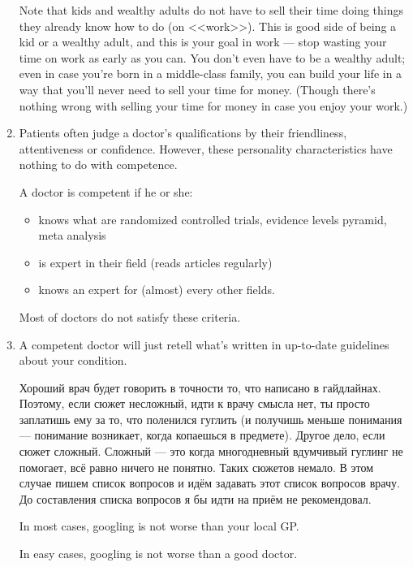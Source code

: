 \documentclass[11pt]{article}
\theoremstyle{remark}
\theoremstyle{definition}
\begin{document}
\begin{enumerate}
Note that kids and wealthy adults do not have to sell their time doing things they already know how to do (on <<work>>). This is good side of being a kid or a wealthy adult, and this is your goal in work --- stop wasting your time on work as early as you can. You don't even have to be a wealthy adult; even in case you're born in a middle-class family, you can build your life in a way that you'll never need to sell your time for money. (Though there's nothing wrong with selling your time for money in case you enjoy your work.) %



\item Patients often judge a doctor's qualifications by their friendliness, attentiveness or confidence. However, these personality characteristics have nothing to do with competence.

A doctor is competent if he or she:

\begin{itemize}
\item knows what are randomized controlled trials, evidence levels pyramid, meta analysis
\item is expert in their field (reads articles regularly)
\item knows an expert for (almost) every other fields.
\end{itemize}

Most of doctors do not satisfy these criteria.

\item A competent doctor will just retell what's written in up-to-date guidelines about your condition. 

Хороший врач будет говорить в точности то, что написано в гайдлайнах. Поэтому, если сюжет несложный, идти к врачу смысла нет, ты просто заплатишь ему за то, что поленился гуглить (и получишь меньше понимания — понимание возникает, когда копаешься в предмете). Другое дело, если сюжет сложный. Сложный — это когда многодневный вдумчивый гуглинг не помогает, всё равно ничего не понятно. Таких сюжетов немало. В этом случае пишем список вопросов и идём задавать этот список вопросов врачу. До составления списка вопросов я бы идти на приём не рекомендовал.

In most cases, googling is not worse than your local GP.

In easy cases, googling is not worse than a good doctor.


\end{enumerate}
\end{document}
